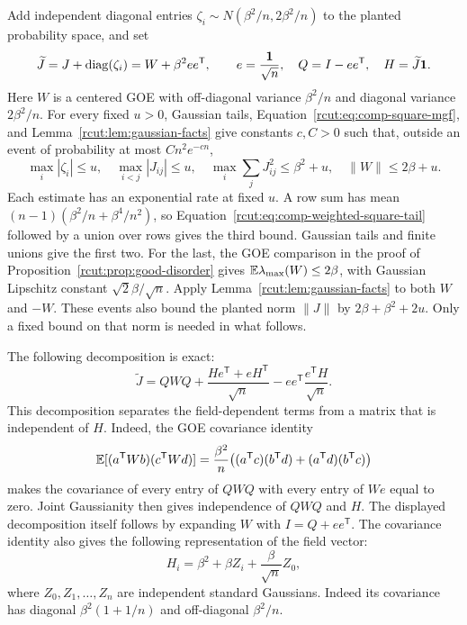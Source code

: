Add independent diagonal entries $\zeta_i\sim N(\beta^2/n,2\beta^2/n)$
to the planted probability space, and set
\begin{equation}
 \widetilde J=J+\operatorname{diag}(\zeta_i)=W+\beta^2ee^{\mathsf T},\qquad
 e=\frac{\boldsymbol 1}{\sqrt n},\quad Q=I-ee^{\mathsf T},\quad
 H=\widetilde J\boldsymbol 1.
 \label{rcut:eq:comp-goe-coupling}
\end{equation}
Here $W$ is a centered GOE with off-diagonal variance $\beta^2/n$
and diagonal variance $2\beta^2/n$.  For every fixed $u>0$, Gaussian
tails, Equation~\eqref{rcut:eq:comp-square-mgf}, and
Lemma~\ref{rcut:lem:gaussian-facts} give constants $c,C>0$ such that,
outside an event of probability at most $Cn^2e^{-cn}$,
\begin{equation}
 \max_i|\zeta_i|\le u,\quad
 \max_{i<j}|J_{ij}|\le u,\quad
 \max_i\sum_jJ_{ij}^2\le\beta^2+u,\quad
 \|W\|\le2\beta+u.
 \label{rcut:eq:comp-basic-events}
\end{equation}
Each estimate has an exponential rate at fixed $u$.  A row sum has
mean $(n-1)(\beta^2/n+\beta^4/n^2)$, so
Equation~\eqref{rcut:eq:comp-weighted-square-tail} followed by a union
over rows gives the third bound.  Gaussian tails and finite unions give
the first two.  For the last, the GOE comparison in the proof of
Proposition~\ref{rcut:prop:good-disorder} gives
$\mathbb E\lambda_{\max}(W)\le2\beta$, with Gaussian Lipschitz constant
$\sqrt2\beta/\sqrt n$.  Apply Lemma~\ref{rcut:lem:gaussian-facts} to
both $W$ and $-W$.  These events also bound the planted norm $\|J\|$
by $2\beta+\beta^2+2u$.  Only a fixed bound on that norm is needed
in what follows.

The following decomposition is exact:
\begin{equation}
 \widetilde J
  =QWQ+\frac{He^{\mathsf T}+eH^{\mathsf T}}{\sqrt n}
       -ee^{\mathsf T}\frac{e^{\mathsf T}H}{\sqrt n}.
 \label{rcut:eq:comp-field-decomposition}
\end{equation}
This decomposition separates the field-dependent terms from a matrix
that is independent of $H$.  Indeed, the GOE covariance identity
\begin{equation}
 \mathbb E[(a^{\mathsf T}Wb)(c^{\mathsf T}Wd)]
  =\frac{\beta^2}{n}
     \bigl((a^{\mathsf T}c)(b^{\mathsf T}d)
                  +(a^{\mathsf T}d)(b^{\mathsf T}c)\bigr)
 \label{rcut:eq:comp-goe-covariance}
\end{equation}
makes the covariance of every entry of $QWQ$ with every entry of
$We$ equal to zero.  Joint Gaussianity then gives independence of
$QWQ$ and $H$.  The displayed decomposition itself follows by
expanding $W$ with $I=Q+ee^{\mathsf T}$.  The covariance identity
also gives the following representation of the field vector:
\begin{equation}
 H_i=\beta^2+\beta Z_i+\frac\beta{\sqrt n}Z_0,
 \label{rcut:eq:comp-field-law}
\end{equation}
where $Z_0,Z_1,\ldots,Z_n$ are independent standard Gaussians.
Indeed its covariance has diagonal $\beta^2(1+1/n)$ and off-diagonal
$\beta^2/n$.

